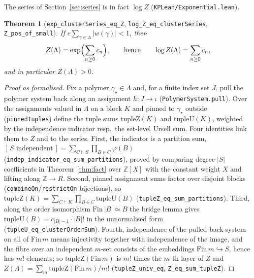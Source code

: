 \documentclass[11pt]{amsart}
\newtheorem{theorem}{Theorem}[section]
\begin{document}
The series of Section~\ref{sec:series} is in fact $\log Z$
(\texttt{KPLean/Exponential.lean}).

\begin{theorem}[\texttt{exp\_clusterSeries\_eq\_Z},
\texttt{log\_Z\_eq\_clusterSeries}, \texttt{Z\_pos\_of\_small}]
\label{thm:exp}
If $e \sum_{\gamma \in \Lambda} \lvert w(\gamma)\rvert < 1$, then
\[
  Z(\Lambda) = \exp\Bigl(\sum_{n \ge 0} c_n\Bigr),
  \qquad\text{hence}\qquad
  \log Z(\Lambda) = \sum_{n \ge 0} c_n,
\]
and in particular $Z(\Lambda) > 0$.
\end{theorem}

\begin{proof}[Proof as formalised]
Fix a polymer $\gamma_\star \in \Lambda$ and, for a finite index set
$J$, pull the polymer system back along an assignment $h : J \to \iota$
(\texttt{PolymerSystem.pull}). Over the assignments valued in $\Lambda$
on a block $K$ and pinned to $\gamma_\star$ outside
(\texttt{pinnedTuples}) define the tuple sums $\mathrm{tupleZ}(K)$ and
$\mathrm{tupleU}(K)$, weighted by the independence indicator resp.\ the
set-level Ursell sum. Four identities link them to $Z$ and to the
series. First, the indicator is a partition sum,
$[\,S \text{ independent}\,] = \sum_{C \vdash S} \prod_{B \in C}
\varphi(B)$
(\texttt{indep\_indicator\_eq\_sum\_partitions}), proved by comparing
degree-$\lvert S\rvert$ coefficients in Theorem~\ref{thm:fact} over
$\mathbb{Z}[X]$ with the constant weight $X$ and lifting along
$\mathbb{Z} \to R$. Second, pinned assignment sums factor over disjoint
blocks (\texttt{combineOn}/\texttt{restrictOn} bijections), so
$\mathrm{tupleZ}(K) = \sum_{C \vdash K} \prod_{B \in C}
\mathrm{tupleU}(B)$ (\texttt{tupleZ\_eq\_sum\_partitions}). Third, along
the order isomorphism $\mathrm{Fin}\,\lvert B\rvert \simeq B$ the bridge
lemma gives $\mathrm{tupleU}(B) = c_{\lvert B\rvert - 1}
\cdot \lvert B\rvert!$ in the unnormalised form
(\texttt{tupleU\_eq\_clusterOrderSum}). Fourth, independence of the
pulled-back system on all of $\mathrm{Fin}\,m$ means injectivity
together with independence of the image, and the fibre over an
independent $m$-set consists of the embeddings
$\mathrm{Fin}\,m \hookrightarrow S$, hence has $m!$ elements; so
$\mathrm{tupleZ}(\mathrm{Fin}\,m)$ is $m!$ times the $m$-th layer of
$Z$ and $Z(\Lambda) = \sum_m \mathrm{tupleZ}(\mathrm{Fin}\,m)/m!$
(\texttt{tupleZ\_univ\_eq}, \texttt{Z\_eq\_sum\_tupleZ}).


\end{proof}
\end{document}
